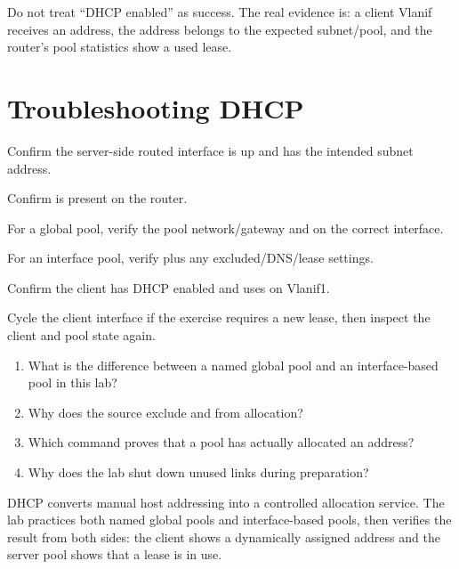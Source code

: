 \begin{verifybox}
Do not treat ``DHCP enabled'' as success. The real evidence is: a client Vlanif receives an address, the address belongs to the expected subnet/pool, and the router's pool statistics show a used lease.
\end{verifybox}

\section{Troubleshooting DHCP}
\begin{netsteps}
\item Confirm the server-side routed interface is up and has the intended subnet address.
\item Confirm  is present on the router.
\item For a global pool, verify the pool network/gateway and  on the correct interface.
\item For an interface pool, verify  plus any excluded/DNS/lease settings.
\item Confirm the client has DHCP enabled and uses  on Vlanif1.
\item Cycle the client interface if the exercise requires a new lease, then inspect the client and pool state again.
\end{netsteps}

\begin{quickcheck}
\begin{enumerate}
\item What is the difference between a named global pool and an interface-based pool in this lab?
\item Why does the source exclude  and  from allocation?
\item Which command proves that a pool has actually allocated an address?
\item Why does the lab shut down unused links during preparation?
\end{enumerate}
\end{quickcheck}

\begin{chapterrecap}
DHCP converts manual host addressing into a controlled allocation service. The lab practices both named global pools and interface-based pools, then verifies the result from both sides: the client shows a dynamically assigned address and the server pool shows that a lease is in use.
\end{chapterrecap}
